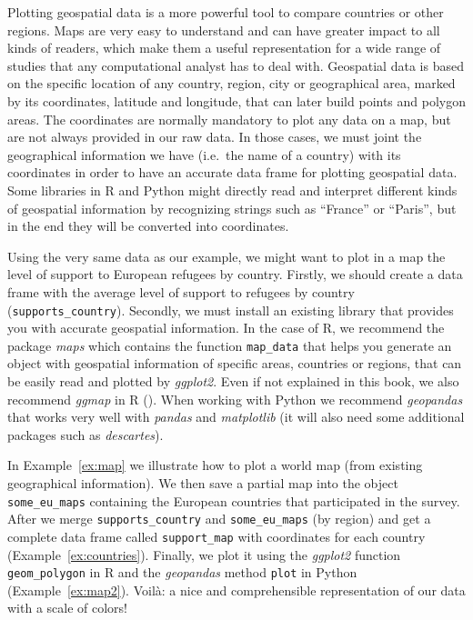 Plotting geospatial data is a more powerful tool to compare countries or other regions.  Maps are very easy to understand and can have greater impact to all kinds of readers, which make them a useful representation for a wide range of studies that any computational analyst has to deal with. Geospatial data is based on the specific location of any country, region, city or geographical area, marked by its coordinates, latitude and longitude, that can later build points and polygon areas. The coordinates are normally mandatory to plot any data on a map, but are not always provided in our raw data. In those cases, we must joint the geographical information we have (i.e.\ the name of a country) with its coordinates in order to have an accurate data frame for plotting geospatial data. Some libraries in R and Python might directly read and interpret different kinds of geospatial information by recognizing strings such as ``France'' or ``Paris'', but in the end they will be converted into coordinates.

Using the very same data 
as our example, we might want to plot in a map the level of support to European refugees by country. Firstly, we should create a data frame with the average level of support to refugees by country (\texttt{supports\_country}). Secondly, we must install an existing library that provides you with accurate geospatial information. In the case of R, we recommend the package \emph{maps} which contains the function \texttt{map\_data} that helps you generate an object with geospatial information of specific areas, countries or regions, that can be easily read and plotted by \emph{ggplot2}. Even if not explained in this book, we also recommend \emph{ggmap} in R (\cite{kahle2013ggmap}). When working with Python we recommend \emph{geopandas} that works very well with \emph{pandas} and \emph{matplotlib} (it will also need some additional packages such as \emph{descartes}).

In Example~\ref{ex:map} we illustrate how to plot a world map (from existing geographical information).
We then save a partial map into the object \texttt{some\_eu\_maps} containing the European countries that participated in the survey. After we merge \texttt{supports\_country} and \texttt{some\_eu\_maps} (by region) and get a complete data frame called \texttt{support\_map} with coordinates for each country (Example~\ref{ex:countries}).
Finally, we plot it using the \emph{ggplot2} function \texttt{geom\_polygon} in R and the \emph{geopandas} method \texttt{plot} in Python (Example~\ref{ex:map2}). Voil\`a: a nice and comprehensible representation of our data with a scale of colors!

